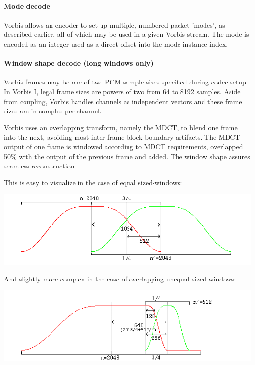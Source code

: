 \paragraph{Mode decode}
Vorbis allows an encoder to set up multiple, numbered packet 'modes',
as described earlier, all of which may be used in a given Vorbis
stream. The mode is encoded as an integer used as a direct offset into
the mode instance index.


\paragraph{Window shape decode (long windows only)} \label{vorbis:spec:window}

Vorbis frames may be one of two PCM sample sizes specified during
codec setup.  In Vorbis I, legal frame sizes are powers of two from 64
to 8192 samples.  Aside from coupling, Vorbis handles channels as
independent vectors and these frame sizes are in samples per channel.

Vorbis uses an overlapping transform, namely the MDCT, to blend one
frame into the next, avoiding most inter-frame block boundary
artifacts.  The MDCT output of one frame is windowed according to MDCT
requirements, overlapped 50\% with the output of the previous frame and
added.  The window shape assures seamless reconstruction.

This is easy to visualize in the case of equal sized-windows:

\begin{center}
\includegraphics[width=\textwidth]{window1}
\end{center}

And slightly more complex in the case of overlapping unequal sized
windows:

\begin{center}
\includegraphics[width=\textwidth]{window2}
\end{center}

